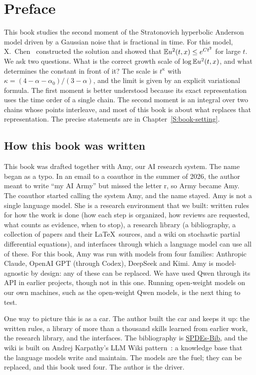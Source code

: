 \chapter*{Preface}

This book studies the second moment of the Stratonovich hyperbolic Anderson
model driven by a Gaussian noise that is fractional in time. For this model,
X.~Chen~\cite{chen:author2026:time-dependency} constructed the solution and
showed that $\mathbb{E} u^2(t,x) \le e^{Ct^2}$ for large $t$. We ask two questions. What
is the correct growth scale of $\log \mathbb{E} u^2(t,x)$, and what determines the
constant in front of it? The scale is $t^\kappa$ with $\kappa =
(4-\alpha-\alpha_0)/(3-\alpha)$, and the limit is given by an explicit
variational formula. The first moment is better understood because its exact
representation uses the time order of a single chain. The second moment is an
integral over two chains whose points interleave, and most of this book is about
what replaces that representation. The precise statements are in
Chapter~\ref{S:book-setting}.

\section*{How this book was written}

This book was drafted together with Amy, our AI research system. The name began
as a typo. In an email to a coauthor in the summer of 2026, the author meant to
write ``my AI Army'' but missed the letter r, so Army became Amy. The coauthor
started calling the system Amy, and the name stayed. Amy is not a single language model.
She is a research environment that we built: written rules for how the work is
done (how each step is organized, how reviews are requested, what counts as
evidence, when to stop), a research library (a bibliography, a collection of
papers and their \LaTeX\ sources, and a wiki on stochastic partial differential
equations), and interfaces through which a language model can use all of these.
For this book, Amy was run with models from four families: Anthropic Claude,
OpenAI GPT (through Codex), DeepSeek and Kimi. Amy is model-agnostic by design:
any of these can be replaced. We have used Qwen through its API in earlier
projects, though not in this one. Running open-weight models on our own
machines, such as the open-weight Qwen models, is the next thing to test.

One way to picture this is as a car. The author built the car and keeps it up:
the written rules, a library of more than a thousand skills learned from earlier
work, the research library, and the interfaces. The bibliography is
\href{https://github.com/chenle02/SPDEs-Bib}{SPDEs-Bib}, and the wiki is built
on Andrej Karpathy's LLM Wiki pattern~\cite{karpathy:26:llm}: a knowledge base
that the language models write and maintain. The models are the fuel; they can
be replaced, and this book used four. The author is the driver.

